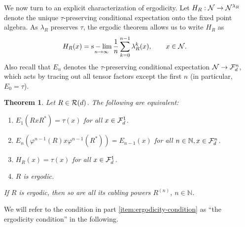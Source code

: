 \documentclass[12pt,a4paper]{amsart}
\numberwithin{equation}{section}
\newtheorem{theorem}{Theorem}[section]
\theoremstyle{remark}
\DeclareMathOperator*{\slim}{s-lim}
\newcommand{\Nl}{\mathbb{N}}
\newcommand{\la}{\lambda}
\begin{document}
We now turn to an explicit characterization of ergodicity. Let $H_R:\CN\to\CN^{\la_R}$ denote the unique $\tau$-preserving conditional expectation onto the fixed point algebra. As $\la_R$ preserves $\tau$, the ergodic theorem allows us to write $H_R$ as 
\begin{align}\label{eq:ergodic-mean}
	H_R(x)
	&=
	\slim_{n\to\infty}\frac{1}{n}\sum_{k=0}^{n-1}\la_R^k(x)
	,\qquad
	x\in\CN.
\end{align}
Also recall that $E_n$ denotes the $\tau$-preserving conditional expectation $\mathcal{N}\to\mathcal{F}_d^n$, which acts by tracing out all tensor factors except the first $n$ (in particular, $E_0=\tau$).
    
\begin{theorem}\label{thm:ergodicity}
    Let $R\in\mathcal{R}(d)$. The following are equivalent:
    \begin{enumerate}
		\item\label{item:ergodicity-condition} $E_1(RxR^*)=\tau(x)$ for all $x\in\mathcal{F}_d^1$.
		\item\label{item:ergodicity-condition+} $E_n(\varphi^{n-1}(R)x\varphi^{n-1}(R^*))=E_{n-1}(x)$ for all $n\in\Nl,x\in\CF_d^n$.
		\item\label{item:1ergodicity} $H_R(x)=\tau(x)$ for all $x\in\mathcal{F}_d^1$.
		\item\label{item:ergodicity} $R$ is ergodic.
    \end{enumerate}
    If $R$ is ergodic, then so are all its cabling powers $R^{(n)}$, $n\in\Nl$.
\end{theorem}

We will refer to the condition in part \ref{item:ergodicity-condition} as ``the ergodicity condition'' in the following. 

\pagebreak
\end{document}
